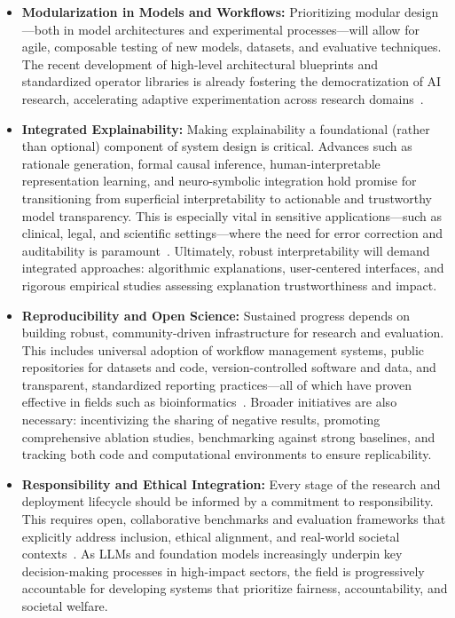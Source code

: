 \begin{itemize}
    \item \textbf{Modularization in Models and Workflows:} Prioritizing modular design—both in model architectures and experimental processes—will allow for agile, composable testing of new models, datasets, and evaluative techniques. The recent development of high-level architectural blueprints and standardized operator libraries is already fostering the democratization of AI research, accelerating adaptive experimentation across research domains~\cite{ref78,ref86,ref87,ref98,ref100}.
    
    \item \textbf{Integrated Explainability:} Making explainability a foundational (rather than optional) component of system design is critical. Advances such as rationale generation, formal causal inference, human-interpretable representation learning, and neuro-symbolic integration hold promise for transitioning from superficial interpretability to actionable and trustworthy model transparency. This is especially vital in sensitive applications—such as clinical, legal, and scientific settings—where the need for error correction and auditability is paramount~\cite{ref9,ref31,ref36,ref49,ref50,ref51,ref55,ref96,ref101}. Ultimately, robust interpretability will demand integrated approaches: algorithmic explanations, user-centered interfaces, and rigorous empirical studies assessing explanation trustworthiness and impact.
    
    \item \textbf{Reproducibility and Open Science:} Sustained progress depends on building robust, community-driven infrastructure for research and evaluation. This includes universal adoption of workflow management systems, public repositories for datasets and code, version-controlled software and data, and transparent, standardized reporting practices—all of which have proven effective in fields such as bioinformatics~\cite{ref81,ref83,ref91,ref92,ref95,ref97,ref99,ref106,ref107,ref108}. Broader initiatives are also necessary: incentivizing the sharing of negative results, promoting comprehensive ablation studies, benchmarking against strong baselines, and tracking both code and computational environments to ensure replicability.
    
    \item \textbf{Responsibility and Ethical Integration:} Every stage of the research and deployment lifecycle should be informed by a commitment to responsibility. This requires open, collaborative benchmarks and evaluation frameworks that explicitly address inclusion, ethical alignment, and real-world societal contexts~\cite{ref93,ref94,ref96,ref98,ref104,ref107,ref108}. As LLMs and foundation models increasingly underpin key decision-making processes in high-impact sectors, the field is progressively accountable for developing systems that prioritize fairness, accountability, and societal welfare.
\end{itemize}

